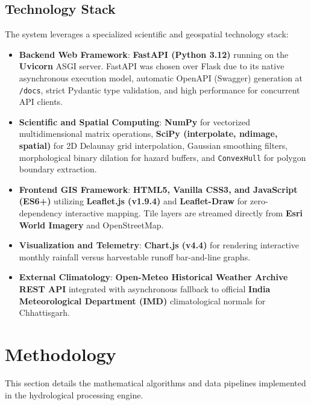 \documentclass[manuscript,screen,nonacm]{acmart}
\begin{document}
\subsection{Technology Stack}
The system leverages a specialized scientific and geospatial technology stack:
\begin{itemize}
    \item \textbf{Backend Web Framework}: \textbf{FastAPI (Python 3.12)} running on the \textbf{Uvicorn} ASGI server. FastAPI was chosen over Flask due to its native asynchronous execution model, automatic OpenAPI (Swagger) generation at \texttt{/docs}, strict Pydantic type validation, and high performance for concurrent API clients.
    \item \textbf{Scientific and Spatial Computing}: \textbf{NumPy} for vectorized multidimensional matrix operations, \textbf{SciPy (interpolate, ndimage, spatial)} for 2D Delaunay grid interpolation, Gaussian smoothing filters, morphological binary dilation for hazard buffers, and \texttt{ConvexHull} for polygon boundary extraction.
    \item \textbf{Frontend GIS Framework}: \textbf{HTML5, Vanilla CSS3, and JavaScript (ES6+)} utilizing \textbf{Leaflet.js (v1.9.4)} and \textbf{Leaflet-Draw} for zero-dependency interactive mapping. Tile layers are streamed directly from \textbf{Esri World Imagery} and OpenStreetMap.
    \item \textbf{Visualization and Telemetry}: \textbf{Chart.js (v4.4)} for rendering interactive monthly rainfall versus harvestable runoff bar-and-line graphs.
    \item \textbf{External Climatology}: \textbf{Open-Meteo Historical Weather Archive REST API} integrated with asynchronous fallback to official \textbf{India Meteorological Department (IMD)} climatological normals for Chhattisgarh.
\end{itemize}

\section{Methodology}
\label{sec:methodology}
This section details the mathematical algorithms and data pipelines implemented in the hydrological processing engine.
\end{document}
